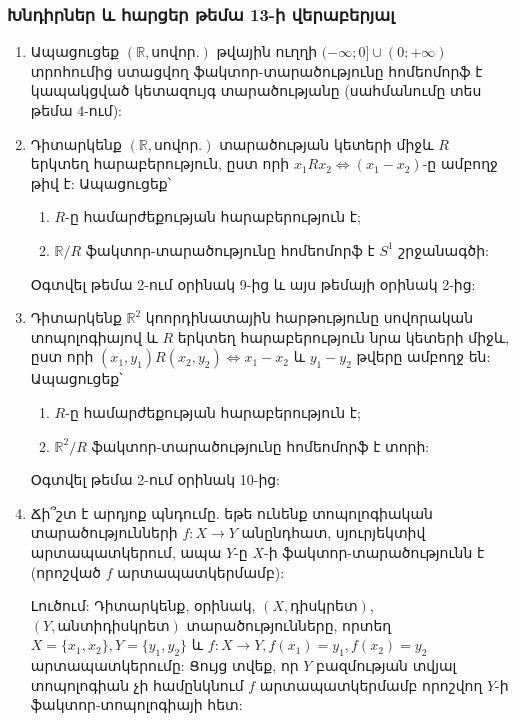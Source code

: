 \bigskip
\bigskip
\subsubsection*{Խնդիրներ և հարցեր թեմա 13-ի վերաբերյալ}

\begin{enumerate}[label=\thesection.\arabic*.]

\item Ապացուցեք $(\mathbb{R}, \text{սովոր.})$ թվային ուղղի $(-\infty; 0] \cup (0; +\infty)$ տրոհումից ստացվող ֆակտոր-տարածությունը հոմեոմորֆ է կապակցված կետազույգ տարածությանը (սահմանումը տես թեմա 4-ում):

\item Դիտարկենք $(\mathbb{R}, \text{սովոր.})$ տարածության կետերի միջև $R$ երկտեղ հարաբերություն, ըստ որի $x_1 R x_2 \Leftrightarrow (x_1 - x_2)$-ը ամբողջ թիվ է: Ապացուցեք՝
\begin{enumerate}
    \item[ա)] $R$-ը համարժեքության հարաբերություն է;
    \item[բ)] $\mathbb{R}/R$ ֆակտոր-տարածությունը հոմեոմորֆ է $S^1$ շրջանագծի:
\end{enumerate}

\begin{hint}
Օգտվել թեմա 2-ում օրինակ 9-ից և այս թեմայի օրինակ 2-ից:
\end{hint}

\item Դիտարկենք $\mathbb{R}^2$ կոորդինատային հարթությունը սովորական տոպոլոգիայով և $R$ երկտեղ հարաբերություն նրա կետերի միջև, ըստ որի $(x_1, y_1) R (x_2, y_2) \Leftrightarrow x_1 - x_2$ և $y_1 - y_2$ թվերը ամբողջ են: Ապացուցեք՝
\begin{enumerate}
    \item[ա)] $R$-ը համարժեքության հարաբերություն է;
    \item[բ)] $\mathbb{R}^2/R$ ֆակտոր-տարածությունը հոմեոմորֆ է տորի:
\end{enumerate}

\begin{hint}
Օգտվել թեմա 2-ում օրինակ 10-ից:
\end{hint}

\item Ճի՞շտ է արդյոք պնդումը. եթե ունենք տոպոլոգիական տարածությունների $f: X \to Y$ անընդհատ, սյուրյեկտիվ արտապատկերում, ապա $Y$-ը $X$-ի ֆակտոր-տարածությունն է (որոշված $f$ արտապատկերմամբ):
\par Լուծում: Դիտարկենք, օրինակ, $(X, \text{դիսկրետ})$, $(Y, \text{անտիդիսկրետ})$ տարածությունները, որտեղ $X=\{x_1, x_2\}, Y=\{y_1, y_2\}$ և $f: X \to Y, f(x_1)=y_1, f(x_2)=y_2$ արտապատկերումը: Ցույց տվեք, որ $Y$ բազմության տվյալ տոպոլոգիան չի համընկնում $f$ արտապատկերմամբ որոշվող $Y$-ի ֆակտոր-տոպոլոգիայի հետ:


\end{enumerate}
